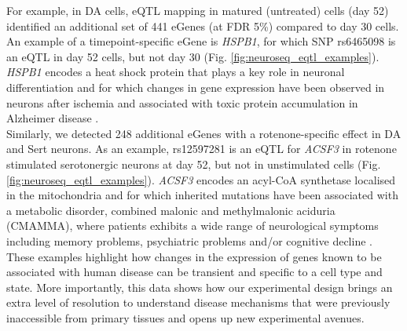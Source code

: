 For example, in DA cells, eQTL mapping in matured (untreated) cells (day 52) identified an additional set of 441 eGenes (at FDR 5\%) compared to day 30 cells.
An example of a timepoint-specific eGene is \textit{HSPB1}, for which SNP rs6465098 is an eQTL in day 52 cells, but not day 30 (Fig. \ref{fig:neuroseq_eqtl_examples}). 
\textit{HSPB1} encodes a heat shock protein that plays a key role in neuronal differentiation \cite{miller2018heat} and for which changes in gene expression have been observed in neurons after ischemia \cite{bartelt2016hspb5} and associated with toxic protein accumulation in Alzheimer disease \cite{shimura2004binding, wilhelmus2006small}.\\

Similarly, we detected 248 additional eGenes with a rotenone-specific effect in DA and Sert neurons. 
As an example, rs12597281 is an eQTL for \textit{ACSF3} in rotenone stimulated serotonergic neurons at day 52, but not in unstimulated cells (Fig. \ref{fig:neuroseq_eqtl_examples}). 
\textit{ACSF3} encodes an acyl-CoA synthetase localised in the mitochondria and for which inherited mutations have been associated with a metabolic disorder, combined malonic and methylmalonic aciduria (CMAMMA), where patients exhibits a wide range of neurological symptoms including memory problems, psychiatric problems and/or cognitive decline \cite{tucci2020brain}.\\

These examples highlight how changes in the expression of genes known to be associated with human disease can be transient and specific to a cell type and state. 
More importantly, this data shows how our experimental design brings an extra level of resolution to understand disease mechanisms that were previously inaccessible from primary tissues and opens up new experimental avenues. \\




